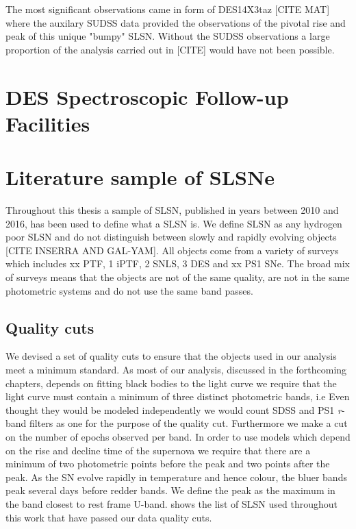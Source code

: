 The most significant observations came in form of DES14X3taz [CITE MAT] where the auxilary SUDSS data provided the observations of the pivotal rise and peak of this unique "bumpy" SLSN. Without the SUDSS observations a large proportion of the analysis carried out in [CITE] would have not been possible.

\section{DES Spectroscopic Follow-up Facilities}

\section{Literature sample of SLSNe}
Throughout this thesis a sample of SLSN, published in years between 2010 and 2016, has been used to define what a SLSN is. We define SLSN as any hydrogen poor SLSN and do not distinguish between slowly and rapidly evolving objects [CITE INSERRA AND GAL-YAM]. All objects come from a variety of surveys which includes xx PTF, 1 iPTF, 2 SNLS, 3 DES and xx PS1 SNe. The broad mix of surveys means that the objects are not of the same quality, are not in the same photometric systems and do not use the same band passes.

\subsection{Quality cuts}
We devised a set of quality cuts to ensure that the objects used in our analysis meet a minimum standard. As most of our analysis, discussed in the forthcoming chapters, depends on fitting black bodies to the light curve we require that the light curve must contain a minimum of three distinct photometric bands, i.e Even thought they would be modeled independently we would count SDSS and PS1 \textit{r}-band filters as one for the purpose of the quality cut. Furthermore we make a cut on the number of epochs observed per band. In order to use models which depend on the rise and decline time of the supernova we require that there are a minimum of two photometric points before the peak and two points after the peak. As the SN evolve rapidly in temperature and hence colour, the bluer bands peak several days before redder bands. We define the peak as the maximum in the band closest to rest frame U-band.  shows the list of SLSN used throughout this work that have passed our data quality cuts.

